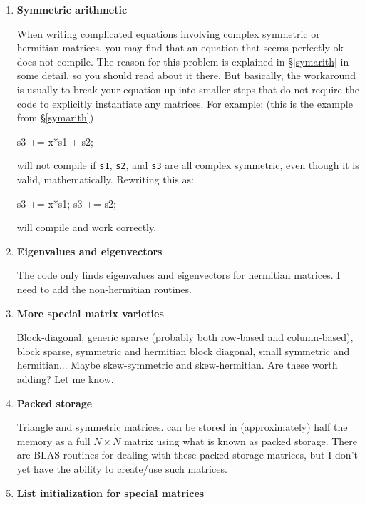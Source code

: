 \documentclass[twoside,letterpaper,11pt]{article}
\renewcommand{\tt}[1]{{\lstinline {#1}}}
\begin{document}
\begin{enumerate}
\item
\textbf{Symmetric arithmetic}

When writing complicated equations involving complex symmetric or hermitian matrices, 
you may find that an equation that seems perfectly ok does not compile.
The reason for this problem is explained in \S\ref{symarith} in some detail, 
so you should read about it there.  But basically, the workaround is usually
to break your equation up into smaller steps that do not require the code to 
explicitly instantiate any matrices.  For example: (this is the example from \S\ref{symarith})
\begin{tmvcode}
s3 += x*s1 + s2;
\end{tmvcode}
will not compile if \tt{s1}, \tt{s2}, and \tt{s3} are all complex symmetric, even though it is 
valid, mathematically.  Rewriting this as:
\begin{tmvcode}
s3 += x*s1;
s3 += s2;
\end{tmvcode}
will compile and work correctly.

\item
\textbf{Eigenvalues and eigenvectors}

The code only finds eigenvalues and eigenvectors for hermitian matrices.
I need to add the non-hermitian routines.

\item
\textbf{More special matrix varieties}

Block-diagonal, generic sparse (probably both
row-based and column-based), block sparse, symmetric and hermitian block
diagonal, small symmetric and hermitian...
Maybe skew-symmetric and skew-hermitian.  Are these worth adding?  Let me know.

\item
\textbf{Packed storage}

Triangle and symmetric matrices. can be stored in (approximately) half the 
memory as a full $N \times N$ matrix using what is known as packed storage.  
There are BLAS routines for dealing with
these packed storage matrices, but I don't yet have the ability to 
create/use such matrices.

\item
\textbf{List initialization for special matrices}


\end{enumerate}
\end{document}
